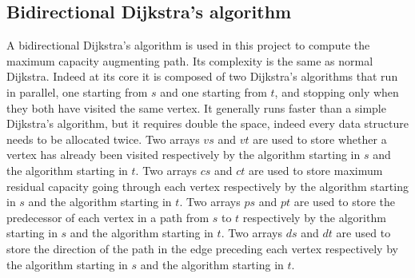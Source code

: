 \subsection{Bidirectional Dijkstra's algorithm}
A bidirectional Dijkstra's algorithm is used in this project to compute the maximum capacity augmenting path. Its complexity is the same as normal Dijkstra.
Indeed at its core it is composed of two Dijkstra's algorithms that run in parallel, one starting from $s$ and one starting from $t$,
and stopping only when they both have visited the same vertex. It generally runs faster than a simple Dijkstra's algorithm, but it requires double the space, indeed every
data structure needs to be allocated twice.
Two arrays $vs$ and $vt$ are used to store whether a vertex has already been visited respectively by the algorithm starting in $s$ and the algorithm starting in $t$.
Two arrays $cs$ and $ct$ are used to store maximum residual capacity going through each vertex respectively by the algorithm starting in $s$ and the algorithm starting in $t$.
Two arrays $ps$ and $pt$ are used to store the predecessor of each vertex in a path from $s$ to $t$ respectively by the algorithm starting in $s$ and the algorithm starting in $t$.
Two arrays $ds$ and $dt$ are used to store the direction of the path in the edge preceding each vertex respectively by the algorithm starting in $s$ and the algorithm starting in $t$.

